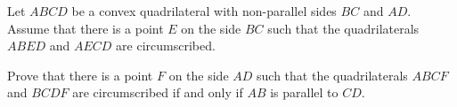 Let 
$ABCD$
 be a convex quadrilateral with non-parallel sides 
$BC$
 and 
$AD$.
 Assume that there is a point 
$E$
 on the side 
$BC$
 such that the quadrilaterals 
$ABED$
 and 
$AECD$
 are circumscribed.
 
 Prove that there is a point 
$F$
 on the side 
$AD$
 such that the quadrilaterals 
$ABCF$
 and 
$BCDF$
 are circumscribed if and only if 
$AB$
 is parallel to 
$CD$.
